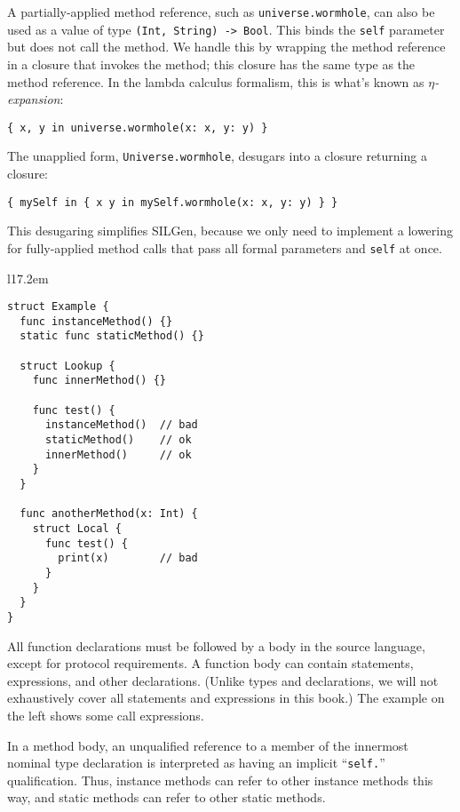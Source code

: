 \documentclass[../generics]{subfiles}
\begin{document}
A partially-applied method reference, such as \texttt{universe.wormhole}, can also be used as a value of type \verb|(Int, String) -> Bool|. This binds the \texttt{self} parameter but does not call the method. We handle this by wrapping the method reference in a closure that invokes the method; this closure has the same type as the method reference. In the lambda calculus formalism, this is what's known as \emph{$\eta$-expansion}:
\begin{Verbatim}
{ x, y in universe.wormhole(x: x, y: y) }
\end{Verbatim}
The unapplied form, \texttt{Universe.wormhole}, desugars into a closure returning a closure:
\begin{Verbatim}
{ mySelf in { x y in mySelf.wormhole(x: x, y: y) } }
\end{Verbatim}
This desugaring simplifies SILGen, because we only need to implement a lowering for fully-applied method calls that pass all formal parameters and \texttt{self} at once.

\begin{wrapfigure}[25]{l}{17.2em}
\begin{minipage}{17em}
\begin{Verbatim}
struct Example {
  func instanceMethod() {}
  static func staticMethod() {}

  struct Lookup {
    func innerMethod() {}

    func test() {
      instanceMethod()  // bad
      staticMethod()    // ok
      innerMethod()     // ok
    }
  }

  func anotherMethod(x: Int) {
    struct Local {
      func test() {
        print(x)        // bad
      }
    }
  }
}
\end{Verbatim}
\end{minipage}
\end{wrapfigure}

All function declarations must be followed by a body in the source language, except for protocol requirements. A function body can contain statements, expressions, and other declarations. (Unlike types and declarations, we will not exhaustively cover all statements and expressions in this book.) The example on the left shows some call expressions.

In a method body, an unqualified reference to a member of the innermost nominal type declaration is interpreted as having an implicit ``\texttt{self.}'' qualification. Thus, instance methods can refer to other instance methods this way, and static methods can refer to other static methods.
\end{document}
